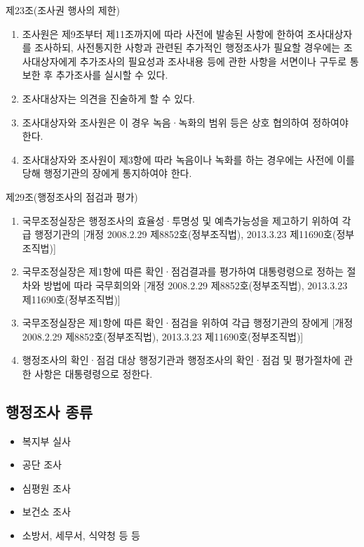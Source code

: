 제23조(조사권 행사의 제한)
\begin{enumerate}[①]\tightlist
\item 조사원은 제9조부터 제11조까지에 따라 사전에 발송된 사항에 한하여 조사대상자를 조사하되, 사전통지한 사항과 관련된 추가적인 행정조사가 필요할 경우에는 조사대상자에게 추가조사의 필요성과 조사내용 등에 관한 사항을 서면이나 구두로 통보한 후 추가조사를 실시할 수 있다.
\item 조사대상자는  의견을 진술하게 할 수 있다.
\item 조사대상자와 조사원은  이 경우 녹음·녹화의 범위 등은 상호 협의하여 정하여야 한다.
\item 조사대상자와 조사원이 제3항에 따라 녹음이나 녹화를 하는 경우에는 사전에 이를 당해 행정기관의 장에게 통지하여야 한다.
\end{enumerate}

제29조(행정조사의 점검과 평가)
\begin{enumerate}[①]\tightlist
\item 국무조정실장은 행정조사의 효율성·투명성 및 예측가능성을 제고하기 위하여 각급 행정기관의  [개정 2008.2.29 제8852호(정부조직법), 2013.3.23 제11690호(정부조직법)]
\item 국무조정실장은 제1항에 따른 확인·점검결과를 평가하여 대통령령으로 정하는 절차와 방법에 따라 국무회의와  [개정 2008.2.29 제8852호(정부조직법), 2013.3.23 제11690호(정부조직법)]
\item 국무조정실장은 제1항에 따른 확인·점검을 위하여 각급 행정기관의 장에게  [개정 2008.2.29 제8852호(정부조직법), 2013.3.23 제11690호(정부조직법)]
\item 행정조사의 확인·점검 대상 행정기관과 행정조사의 확인·점검 및 평가절차에 관한 사항은 대통령령으로 정한다.
\end{enumerate}

\subsection{행정조사 종류}
\begin{itemize}\tightlist
\item 복지부 실사
\item 공단 조사
\item 심평원 조사 
\item 보건소 조사 
\item 소방서, 세무서, 식약청 등 등
\end{itemize}

